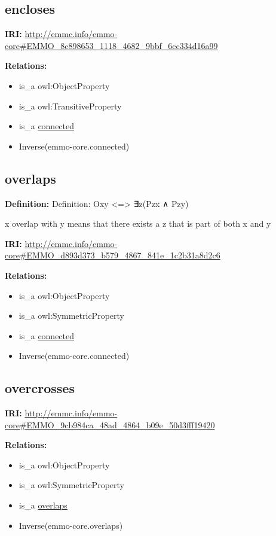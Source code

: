 \documentclass[a4paper,]{report}
\providecommand{\tightlist}{%
  \setlength{\itemsep}{0pt}\setlength{\parskip}{0pt}}
\begin{document}
\hypertarget{encloses}{%
\subsection{encloses}\label{encloses}}

\textbf{IRI:}
\url{http://emmc.info/emmo-core\#EMMO_8c898653_1118_4682_9bbf_6cc334d16a99}

\textbf{Relations:}

\begin{itemize}
\tightlist
\item
  is\_a owl:ObjectProperty
\item
  is\_a owl:TransitiveProperty
\item
  is\_a \protect\hyperlink{connected}{connected}
\item
  Inverse(emmo-core.connected)
\end{itemize}

\hypertarget{overlaps}{%
\subsection{overlaps}\label{overlaps}}

\textbf{Definition:} Definition: Oxy \textless{}=\textgreater{} ∃z(Pzx ∧
Pzy)

x overlap with y means that there exists a z that is part of both x and
y

\textbf{IRI:}
\url{http://emmc.info/emmo-core\#EMMO_d893d373_b579_4867_841e_1c2b31a8d2c6}

\textbf{Relations:}

\begin{itemize}
\tightlist
\item
  is\_a owl:ObjectProperty
\item
  is\_a owl:SymmetricProperty
\item
  is\_a \protect\hyperlink{connected}{connected}
\item
  Inverse(emmo-core.connected)
\end{itemize}

\hypertarget{overcrosses}{%
\subsection{overcrosses}\label{overcrosses}}

\textbf{IRI:}
\url{http://emmc.info/emmo-core\#EMMO_9cb984ca_48ad_4864_b09e_50d3fff19420}

\textbf{Relations:}

\begin{itemize}
\tightlist
\item
  is\_a owl:ObjectProperty
\item
  is\_a owl:SymmetricProperty
\item
  is\_a \protect\hyperlink{overlaps}{overlaps}
\item
  Inverse(emmo-core.overlaps)
\end{itemize}
\end{document}
